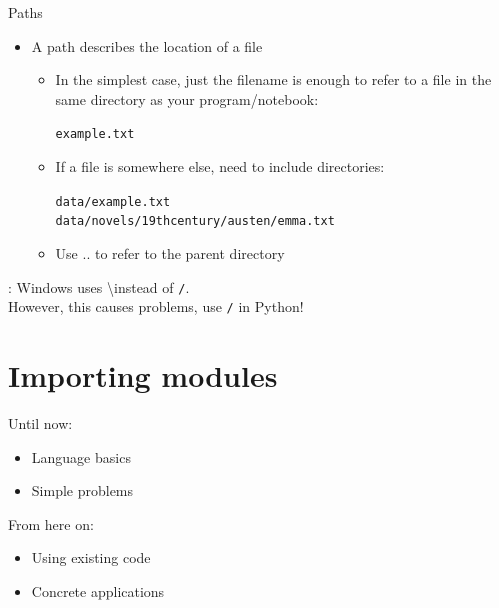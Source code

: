 \documentclass[aspectratio=169,usenames,dvipsnames]{beamer}
\begin{document}
\begin{frame}{Paths}
    \begin{itemize}
        \item A path describes the location of a file
		\begin{itemize}
        \item In the simplest case, just the filename is enough to
            refer to a file in the same directory as your program/notebook:

            \texttt{example.txt}

        \item If a file is somewhere else, need to include directories:

            \texttt{data/example.txt}\\
            \texttt{data/novels/19thcentury/austen/emma.txt}
		\item Use .. to refer to the parent directory
		\end{itemize}
    \end{itemize}
    : Windows uses \textbackslash instead of \texttt{/}. \\
        However, this causes problems, use \texttt{/} in Python!
\end{frame}


\section{Importing modules}
\frame{\tableofcontents[currentsection]}

\begin{frame}
    Until now:
        \begin{itemize}
            \item Language basics
            \item Simple problems
        \end{itemize}
    \pause
    From here on:
        \begin{itemize}
            \item Using existing code
            \item Concrete applications
        \end{itemize}
\end{frame}
\end{document}
